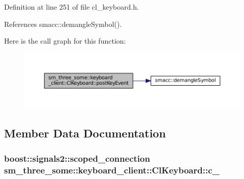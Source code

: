Definition at line 251 of file cl\+\_\+keyboard.\+h.



References smacc\+::demangle\+Symbol().




Here is the call graph for this function\+:
\nopagebreak
\begin{figure}[H]
\begin{center}
\leavevmode
\includegraphics[width=350pt]{classsm__three__some_1_1keyboard__client_1_1ClKeyboard_a1aecba744db201ef667e67c3f7c63333_cgraph}
\end{center}
\end{figure}




\subsection{Member Data Documentation}
\subsubsection[{\texorpdfstring{c\+\_\+}{c_}}]{\setlength{\rightskip}{0pt plus 5cm}boost\+::signals2\+::scoped\+\_\+connection sm\+\_\+three\+\_\+some\+::keyboard\+\_\+client\+::\+Cl\+Keyboard\+::c\+\_\+}\hypertarget{classsm__three__some_1_1keyboard__client_1_1ClKeyboard_aa55cfcdd60014aed37b8318224e47f9d}{}\label{classsm__three__some_1_1keyboard__client_1_1ClKeyboard_aa55cfcdd60014aed37b8318224e47f9d}


